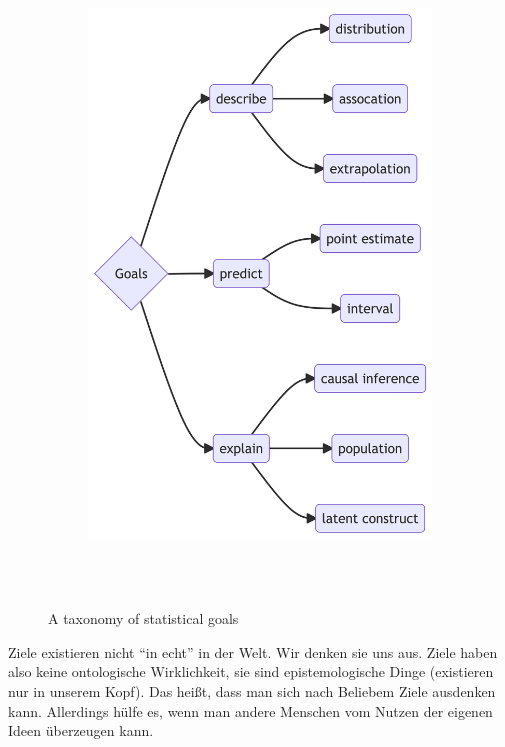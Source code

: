 \documentclass[
  a4paper,
  DIV=11]{scrreprt}
\theoremstyle{definition}
\theoremstyle{remark}
\begin{document}
\begin{figure}

{\centering 

\begin{figure}[H]

{\centering \includegraphics[width=4.29in,height=6.6in]{./Inferenz_files/figure-latex/mermaid-figure-1.png}

}

\end{figure}

}

\caption{\label{fig-goals}A taxonomy of statistical goals}

\end{figure}

\begin{tcolorbox}[enhanced jigsaw, title=\textcolor{quarto-callout-note-color}{\faInfo}\hspace{0.5em}{Hinweis}, bottomtitle=1mm, bottomrule=.15mm, titlerule=0mm, colbacktitle=quarto-callout-note-color!10!white, colframe=quarto-callout-note-color-frame, leftrule=.75mm, left=2mm, toprule=.15mm, colback=white, arc=.35mm, breakable, toptitle=1mm, opacityback=0, rightrule=.15mm, coltitle=black, opacitybacktitle=0.6]

Ziele existieren nicht ``in echt'' in der Welt. Wir denken sie uns aus.
Ziele haben also keine ontologische Wirklichkeit, sie sind
epistemologische Dinge (existieren nur in unserem Kopf). Das heißt, dass
man sich nach Beliebem Ziele ausdenken kann. Allerdings hülfe es, wenn
man andere Menschen vom Nutzen der eigenen Ideen überzeugen kann.

\end{tcolorbox}
\end{document}
